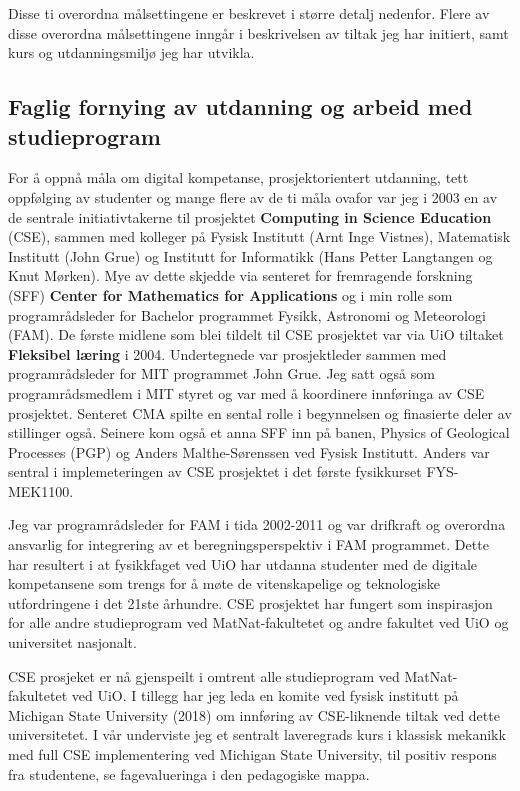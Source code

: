 \documentclass[aps,floatfix,preprint]{revtex4-1}
\begin{document}
Disse ti overordna målsettingene er beskrevet i større detalj nedenfor. Flere av disse overordna
målsettingene inngår i beskrivelsen av tiltak jeg har initiert,
samt kurs og utdanningsmiljø jeg har utvikla.


\subsection*{Faglig fornying av utdanning og arbeid med studieprogram}

For å oppnå måla om digital kompetanse, prosjektorientert utdanning,
tett oppfølging av studenter og mange flere av de ti måla ovafor var
jeg i 2003 en av de sentrale initiativtakerne til prosjektet \textbf{Computing in Science
Education} (CSE), sammen med kolleger på Fysisk Institutt (Arnt Inge Vistnes), Matematisk Institutt (John Grue) og Institutt for Informatikk (Hans Petter Langtangen og Knut Mørken). Mye av dette skjedde via
senteret for fremragende forskning (SFF) \textbf{Center for Mathematics for
Applications} og i min rolle som programrådsleder for Bachelor programmet Fysikk,
Astronomi og Meteorologi (FAM). De første midlene som blei tildelt til CSE
prosjektet var via UiO tiltaket \textbf{Fleksibel læring} i 2004. Undertegnede var
prosjektleder sammen med programrådsleder for MIT programmet John
Grue. Jeg satt også som programrådsmedlem i MIT styret og var med å koordinere innføringa av CSE prosjektet.
Senteret CMA spilte en sental rolle i begynnelsen og finasierte deler av stillinger også. Seinere kom også et anna 
SFF inn på banen, Physics of Geological Processes (PGP) og Anders Malthe-Sørenssen ved Fysisk Institutt. Anders var sentral i implemeteringen av CSE prosjektet i det første fysikkurset FYS-MEK1100.

Jeg var programrådsleder for FAM i tida 2002-2011 og var drifkraft
og overordna ansvarlig for integrering av et beregningsperspektiv i
FAM programmet. Dette har resultert i at fysikkfaget ved UiO har
utdanna studenter med de digitale kompetansene som trengs for å møte
de vitenskapelige og teknologiske utfordringene i det 21ste
århundre. CSE prosjektet har fungert som inspirasjon for alle andre
studieprogram ved MatNat-fakultetet og andre fakultet ved UiO og
universitet nasjonalt.

CSE prosjeket er nå gjenspeilt i omtrent alle studieprogram ved
MatNat-fakultetet ved UiO. I tillegg har jeg leda en komite ved fysisk
institutt på Michigan State University (2018) om innføring av CSE-liknende tiltak
ved dette universitetet. I vår underviste jeg et sentralt laveregrads kurs i
klassisk mekanikk med full CSE implementering ved Michigan State
University, til  positiv respons fra studentene, se fagevalueringa
i den pedagogiske mappa.
\end{document}
